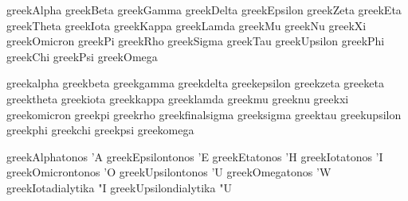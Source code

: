 \stopencoding


\startencoding[default]


 greekAlpha   {\Alpha}
 greekBeta    {\Beta}
 greekGamma   {\Gamma}
 greekDelta   {\Delta}
 greekEpsilon {\Epsilon}
 greekZeta    {\Zeta}
 greekEta     {\Eta}
 greekTheta   {\Theta}
 greekIota    {\Iota}
 greekKappa   {\Kappa}
 greekLamda   {\Lamba}
 greekMu      {\Mu}
 greekNu      {\Nu}
 greekXi      {\Xi}
 greekOmicron {\Omicron}
 greekPi      {\Pi}
 greekRho     {\Rho}
 greekSigma   {\Sigma}
 greekTau     {\Tau}
 greekUpsilon {\Upsilon}
 greekPhi     {\Phi}
 greekChi     {\Chi}
 greekPsi     {\Psi}
 greekOmega   {\Omega}


 greekalpha      {\alpha}
 greekbeta       {\beta}
 greekgamma      {\gamma}
 greekdelta      {\delta}
 greekepsilon    {\epsilon}
 greekzeta       {\zeta}
 greeketa        {\eta}
 greektheta      {\theta}
 greekiota       {\iota}
 greekkappa      {\kappa}
 greeklamda      {\lambda}
 greekmu         {\mu}
 greeknu         {\nu}
 greekxi         {\xi}
 greekomicron    {\omicron}
 greekpi         {\pi}
 greekrho        {\rho}
 greekfinalsigma {\sigma}
 greeksigma      {\sigma}
 greektau        {\tau}
 greekupsilon    {\upsilon}
 greekphi        {\phi}
 greekchi        {\chi}
 greekpsi        {\psi}
 greekomega      {\omega}


 greekAlphatonos       {'A}
 greekEpsilontonos     {'E}
 greekEtatonos         {'H}
 greekIotatonos        {'I}
 greekOmicrontonos     {'O}
 greekUpsilontonos     {'U}
 greekOmegatonos       {'W}
 greekIotadialytika    {"I}
 greekUpsilondialytika {"U}

